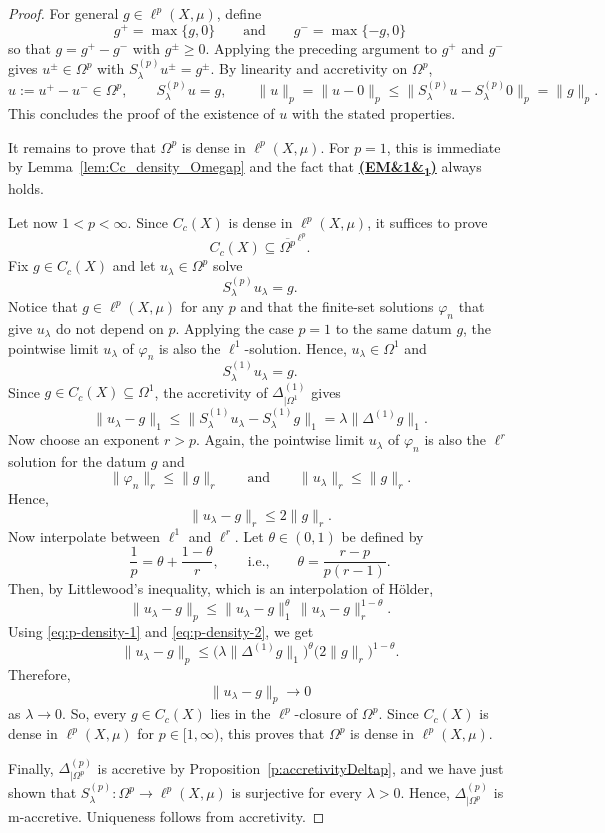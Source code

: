 \documentclass[letterpaper]{article}
\theoremstyle{definition}
\theoremstyle{named}
\numberwithin{equation}{section}
\newcommand{\EM}[1][]{\hyperlink{ass:EM}{\textup{\textbf{(EM\ifx&#1&\else\textsubscript{#1}\fi)}}}}
\newcommand{\lm}{\lambda}
\begin{document}
\begin{proof}
For general $g \in \ell^p(X,\mu)$, define
\[
g^+=\max\{g,0\}\qquad \mbox{and} \qquad g^-=\max\{-g,0\}
\]
so that $g=g^+ - g^-$ with $g^\pm\geq 0$. Applying the preceding argument to $g^+$ and $g^-$ gives $u^\pm\in\Omega^p$ with $S^{(p)}_\lambda u^\pm=g^\pm$. By linearity and accretivity on $\Omega^p$,
\[
u:=u^+-u^-\in\Omega^p,
\qquad
S^{(p)}_\lambda u=g, \qquad \|u\|_p = \|u-0\|_p \le \|S_\lambda^{(p)}u - S_\lambda^{(p)}0\|_p = \|g\|_p.
\]
This concludes the proof of the existence of $u$ with the stated properties.

It remains to prove that $\Omega^p$ is dense in $\ell^p(X,\mu)$. For $p=1$, this is immediate by  Lemma~\ref{lem:Cc_density_Omegap} and the fact that \EM[1] always holds.  

Let now $1<p<\infty$. Since $C_c(X)$ is dense in $\ell^p(X,\mu)$, it suffices to prove
\[
C_c(X)\subseteq \overline{\Omega^p}^{\,\ell^p}.
\]
Fix $g\in C_c(X)$ and let $u_\lambda\in\Omega^p$ solve
\[
S^{(p)}_\lambda u_\lambda=g.
\]
Notice that $g\in\ell^p(X,\mu)$ for any $p$ and that the finite-set solutions 
$\varphi_n$ that give $u_\lm$ do 
not depend on $p$. Applying the case $p=1$  to the same datum $g$, the pointwise limit $u_\lambda$ of $\varphi_n$ is also the $\ell^1$-solution. Hence, $u_\lambda\in\Omega^1$ and
\[
 S^{(1)}_\lambda u_\lambda=g.
\]
Since $g\in C_c(X)\subseteq\Omega^1$, the accretivity of $\Delta^{(1)}_{|\Omega^1}$ gives
\begin{equation}\label{eq:p-density-1}
\|u_\lambda-g\|_1
\leq
\| S^{(1)}_\lambda u_\lambda- S^{(1)}_\lambda g\|_1
=
\lambda\|\Delta^{(1)} g\|_1. 
\end{equation}
Now choose an  exponent $r>p$. Again, the pointwise limit $u_\lambda$ of $\varphi_n$ is also the $\ell^r$ solution for the datum $g$ and 
\[
\|\varphi_n\|_r \leq \|g\|_r \qquad \text{and} \qquad \|u_\lambda\|_r \leq \|g\|_r.
\]
Hence,
\begin{equation}\label{eq:p-density-2}
\|u_\lambda-g\|_r \leq 2\|g\|_r. 
\end{equation}
Now interpolate between $\ell^1$ and $\ell^r$. Let $\theta\in(0,1)$ be defined by
\[
\frac{1}{p}=\theta+\frac{1-\theta}{r}, \qquad\text{i.e.,}\qquad \theta=\frac{r-p}{p(r-1)}.
\]
Then, {by Littlewood's inequality, which is an interpolation of H{\"o}lder},
\[
\|u_\lambda-g\|_p \leq \|u_\lambda-g\|_1^{\theta}\,\|u_\lambda-g\|_r^{1-\theta}.
\]
Using \eqref{eq:p-density-1} and \eqref{eq:p-density-2}, we get
\[
\|u_\lambda-g\|_p \leq \bigl(\lambda \|\Delta^{(1)} g\|_1\bigr)^{\theta} \bigl(2\|g\|_r\bigr)^{1-\theta}.
\]
Therefore,
\[
\|u_\lambda-g\|_p\to0
\]
as $\lambda \to 0$.
So, every $g\in C_c(X)$ lies in the $\ell^p$-closure of $\Omega^p$. Since $C_c(X)$ is 
dense in $\ell^p(X,\mu)$ for $p \in [1,\infty)$, this proves that $\Omega^p$ is dense in $\ell^p(X,\mu)$.

Finally, $\Delta^{(p)}_{|\Omega^p}$ is accretive by Proposition~\ref{p:accretivityDeltap}, and we have just shown that $S^{(p)}_\lambda \colon \Omega^p \to \ell^p(X,\mu)$ is surjective for every $\lambda>0$. Hence, $\Delta^{(p)}_{|\Omega^p}$ is m-accretive. Uniqueness follows from accretivity.
\end{proof}
\end{document}
